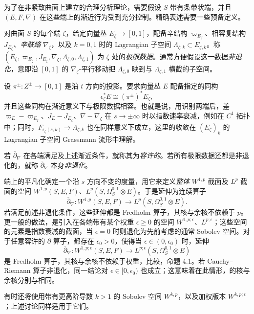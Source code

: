 为了在非紧致曲面上建立的合理分析理论，需要假设 $S$ 带有条带状端，并且 $(E,F,\nabla)$ 在这些端上的渐近行为受到充分控制。精确表述需要一些预备定义。
\begin{definition*}
对曲面 $S$ 的每个端 $\zeta$，给定向量丛 $E_\zeta\to[0,1]$，配备辛结构 $\varpi_{E_\zeta}$、相容复结构 $J_{E_\zeta}$、\emph{辛联络} $\nabla_\zeta$，以及 $k=0,1$ 时的 Lagrangian 子空间 $\Lambda_{\zeta,k}\subset E_{\zeta,k}$。称 $(E_\zeta,\varpi_{E_\zeta},J_{E_\zeta},\nabla_\zeta,\Lambda_{\zeta,0},\Lambda_{\zeta,1})$ 为 $\zeta$ 处的\emph{极限数据}。通常方便假设这一数据\emph{非退化}，意即沿 $[0,1]$ 的 $\nabla_\zeta$-平行移动把 $\Lambda_{\zeta,0}$ 映到与 $\Lambda_{\zeta,1}$ 横截的子空间。
\end{definition*}
设 $\pi^\pm:Z^\pm\to[0,1]$ 是沿 $t$ 方向的投影。要求向量丛 $E$ 配备指定的同构
\begin{equation}\label{eq:8.14}
\epsilon_\zeta^*E\cong(\pi^\pm)^*E_\zeta,
\end{equation}
并且这些同构在渐近意义下与极限数据相容。也就是说，用识别两端后，差 $\varpi_E-\varpi_{E_\zeta}$、$J_E-J_{E_\zeta}$、$\nabla-\nabla_\zeta$ 在 $s\to\pm\infty$ 时以指数速率衰减，例如在 $C^1$ 拓扑中；同时，$F_{\epsilon_\zeta(s,k)}\to\Lambda_{\zeta,k}$ 也在同样意义下成立，这里的收敛在 $(E_\zeta)_k$ 的 Lagrangian 子空间 Grassmann 流形中理解。
\begin{definition*}
若 $\overline\partial_\nabla$ 在各端满足及上述渐近条件，就称其为\emph{容许的}。若所有极限数据还都是非退化的，就称 $\overline\partial_\nabla$ 本身\emph{非退化}。
\end{definition*}
端上的平凡化确定一个沿 $s$ 方向不变的度量，用它来定义\emph{整体} $W^{1,p}$ 截面及 $L^p$ 截面的空间 $W^{1,p}(S,E,F)$、$L^p(S,\Omega_S^{0,1}\otimes E)$。于是延伸为连续算子
\begin{equation}\label{eq:8.15}
\overline\partial_\nabla:W^{1,p}(S,E,F)\longrightarrow L^p(S,\Omega_S^{0,1}\otimes E).
\end{equation}
若满足前述非退化条件，这些延伸都是 Fredholm 算子，其核与余核不依赖于 $p$。更一般的做法，是引入在各端带有某个权重 $\epsilon\geq0$ 的空间 $W^{1,p;\epsilon}$、$L^{p;\epsilon}$；这些空间的元素是指数衰减的截面，当 $\epsilon=0$ 时则退化为先前考虑的通常 Sobolev 空间。对于任意容许的 $\overline\partial$ 算子，都存在 $\epsilon_0>0$，使得当 $\epsilon\in(0,\epsilon_0)$ 时，延伸
\begin{equation}\label{eq:8.16}
\overline\partial_\nabla:W^{1,p;\epsilon}(S,E,F)\longrightarrow L^{p;\epsilon}(S,\Omega_S^{0,1}\otimes E)
\end{equation}
是 Fredholm 算子，其核与余核不依赖于权重，比较，命题 4.1。若 Cauchy–Riemann 算子非退化，同一结论对 $\epsilon\in[0,\epsilon_0)$ 也成立；这意味着在此情形，的核与余核分别与相同。

有时还将使用带有更高阶导数 $k>1$ 的 Sobolev 空间 $W^{k,p}$，以及加权版本 $W^{k,p;\epsilon}$；上述讨论同样适用于它们。
